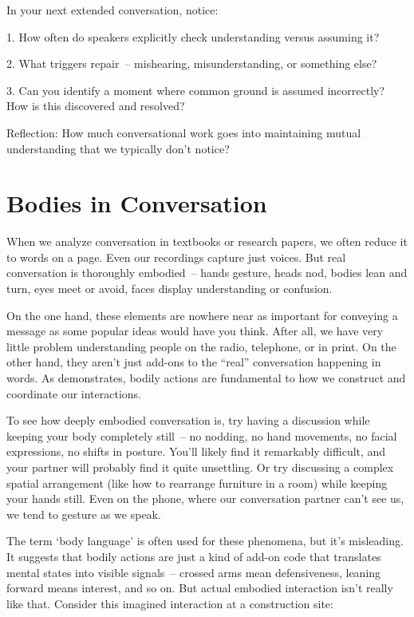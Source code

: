 \begin{tcolorbox}[title=Exercise: Tracking Common Ground, colback=white, colframe=purple!75!black, fonttitle=\bfseries]
In your next extended conversation, notice:

1. How often do speakers explicitly check understanding versus assuming it?

2. What triggers repair~-- mishearing, misunderstanding, or something else?

3. Can you identify a moment where common ground is assumed incorrectly? How is this discovered and resolved?

Reflection: How much conversational work goes into maintaining mutual understanding that we typically don't notice?
\end{tcolorbox}

\section{Bodies in Conversation} \label{sec:bodies}

When we analyze conversation in textbooks or research papers, we often reduce it to words on a page. Even our recordings capture just voices. But real conversation is thoroughly embodied~-- hands gesture, heads nod, bodies lean and turn, eyes meet or avoid, faces display understanding or confusion.

On the one hand, these elements are nowhere near as important for conveying a message as some popular ideas would have you think. After all, we have very little problem understanding people on the radio, telephone, or in print. On the other hand, they aren't just add-ons to the ``real'' conversation happening in words. As \citet{goodwin2000} demonstrates, bodily actions are fundamental to how we construct and coordinate our interactions.

To see how deeply embodied conversation is, try having a discussion while keeping your body completely still~-- no nodding, no hand movements, no facial expressions, no shifts in posture. You'll likely find it remarkably difficult, and your partner will probably find it quite unsettling. Or try discussing a complex spatial arrangement (like how to rearrange furniture in a room) while keeping your hands still. Even on the phone, where our conversation partner can't see us, we tend to gesture as we speak.

The term `body language' is often used for these phenomena, but it's misleading. It suggests that bodily actions are just a kind of add-on code that translates mental states into visible signals~-- crossed arms mean defensiveness, leaning forward means interest, and so on. But actual embodied interaction isn't really like that. Consider this imagined interaction at a construction site:

